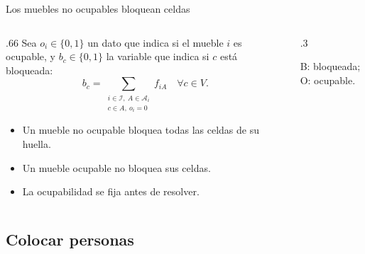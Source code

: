 \documentclass[aspectratio=169,11pt]{beamer}
\newcommand{\examplegrid}{%
  \draw[step=1,ink!35] (0,0) grid (4,4);
  \draw[ink,thick] (0,0) rectangle (4,4);
}
\begin{document}
\begin{frame}{Los muebles no ocupables bloquean celdas}
  \begin{columns}[T,onlytextwidth]
  \begin{column}{.66\textwidth}
  \small
  Sea \(o_i\in\{0,1\}\) un dato que indica si el mueble \(i\) es
  ocupable, y \(b_c\in\{0,1\}\) la variable que indica si \(c\)
  est\'a bloqueada:
  \[
    b_c=\sum_{\substack{i\in\mathcal I,\ A\in\mathcal A_i\\c\in A,\ o_i=0}}f_{iA}
    \quad\forall c\in V.
  \]
  \begin{itemize}
    \setlength{\itemsep}{4mm}
    \item Un mueble no ocupable bloquea todas las celdas de su huella.
    \item Un mueble ocupable no bloquea sus celdas.
    \item La ocupabilidad se fija antes de resolver.
  \end{itemize}
  \end{column}
  \begin{column}{.3\textwidth}
    \centering
    \par\smallskip\scriptsize B: bloqueada; O: ocupable.
  \end{column}
  \end{columns}
\end{frame}

\subsection{Colocar personas}
\end{document}
